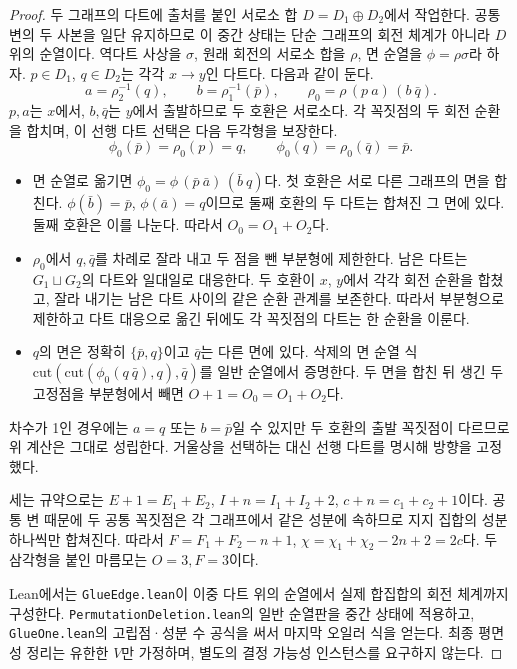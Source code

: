 \begin{proof}
\leanok
두 그래프의 다트에 출처를 붙인 서로소 합 \(D = D_1 \oplus D_2\)에서 작업한다. 공통 변의 두 사본을
일단 유지하므로 이 중간 상태는 단순 그래프의 회전 체계가 아니라 \(D\) 위의 순열이다. 역다트 사상을
\(\sigma\), 원래 회전의 서로소 합을 \(\rho\), 면 순열을 \(\phi = \rho\sigma\)라 하자.
\(p \in D_1\), \(q \in D_2\)는 각각 \(x \to y\)인 다트다. 다음과 같이 둔다.
\[
 a = \rho_2^{-1}(q), \qquad b = \rho_1^{-1}(\bar p), \qquad
 \rho_0 = \rho\,(p\ a)\,(b\ \bar q).
\]
\(p,a\)는 \(x\)에서, \(b,\bar q\)는 \(y\)에서 출발하므로 두 호환은 서로소다. 각 꼭짓점의 두 회전
순환을 합치며, 이 선행 다트 선택은 다음 두각형을 보장한다.
\[
 \phi_0(\bar p) = \rho_0(p) = q, \qquad
 \phi_0(q) = \rho_0(\bar q) = \bar p.
\]
\begin{itemize}
  \item 면 순열로 옮기면 \(\phi_0 = \phi\,(\bar p\ \bar a)\,(\bar b\ q)\)다. 첫 호환은 서로 다른
        그래프의 면을 합친다. \(\phi(\bar b)=\bar p\), \(\phi(\bar a)=q\)이므로 둘째 호환의 두 다트는
        합쳐진 그 면에 있다. 둘째 호환은 이를 나눈다. 따라서 \(O_0 = O_1 + O_2\)다.
  \item \(\rho_0\)에서 \(q,\bar q\)를 차례로 잘라 내고 두 점을 뺀 부분형에 제한한다. 남은 다트는
        \(G_1 \sqcup G_2\)의 다트와 일대일로 대응한다. 두 호환이 \(x\), \(y\)에서 각각 회전 순환을
        합쳤고, 잘라 내기는 남은 다트 사이의 같은 순환 관계를 보존한다. 따라서 부분형으로 제한하고
        다트 대응으로 옮긴 뒤에도 각 꼭짓점의 다트는 한 순환을 이룬다.
  \item \(q\)의 면은 정확히 \(\{\bar p,q\}\)이고 \(\bar q\)는 다른 면에 있다. 삭제의 면 순열 식
        \(\mathrm{cut}(\mathrm{cut}(\phi_0(q\ \bar q),q),\bar q)\)를 일반 순열에서 증명한다.
        두 면을 합친 뒤 생긴 두 고정점을 부분형에서 빼면 \(O+1=O_0=O_1+O_2\)다.
\end{itemize}
차수가 1인 경우에는 \(a=q\) 또는 \(b=\bar p\)일 수 있지만 두 호환의 출발 꼭짓점이 다르므로 위 계산은
그대로 성립한다. 거울상을 선택하는 대신 선행 다트를 명시해 방향을 고정했다.

세는 규약으로는 \(E+1=E_1+E_2\), \(I+n=I_1+I_2+2\), \(c+n=c_1+c_2+1\)이다. 공통 변 때문에 두
공통 꼭짓점은 각 그래프에서 같은 성분에 속하므로 지지 집합의 성분 하나씩만 합쳐진다. 따라서
\(F=F_1+F_2-n+1\), \(\chi=\chi_1+\chi_2-2n+2=2c\)다. 두 삼각형을 붙인 마름모는 \(O=3,F=3\)이다.

Lean에서는 \texttt{GlueEdge.lean}이 이중 다트 위의 순열에서 실제 합집합의 회전 체계까지 구성한다.
\texttt{PermutationDeletion.lean}의 일반 순열판을 중간 상태에 적용하고,
\texttt{GlueOne.lean}의 고립점·성분 수 공식을 써서 마지막 오일러 식을 얻는다.
최종 평면성 정리는 유한한 \(V\)만 가정하며, 별도의 결정 가능성 인스턴스를 요구하지 않는다.
\end{proof}

